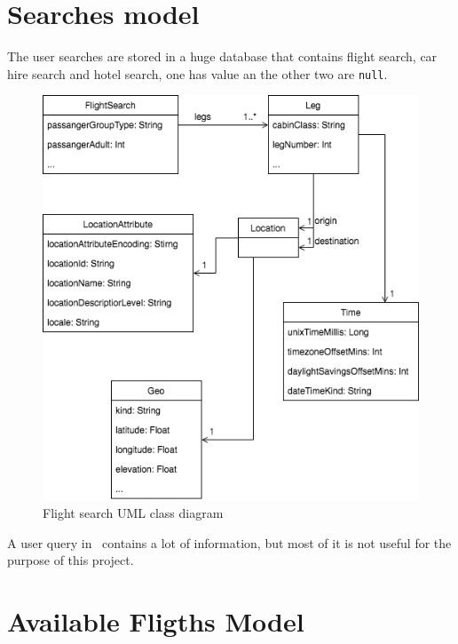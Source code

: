 
\section{Searches model}

The user searches are stored in a huge database that contains flight search, car hire search and hotel search, one has value an the other two are \texttt{null}.

\begin{figure}[H]
\centering
\includegraphics[scale=0.6]{diagrams/flight_search.png}
\caption{Flight search UML\cite{uml} class diagram}
\end{figure}

A user query in \company\ contains a lot of information, but most of it is not useful for the purpose of this project.


\section{Available Fligths Model} \label{flight-availablity-model}

